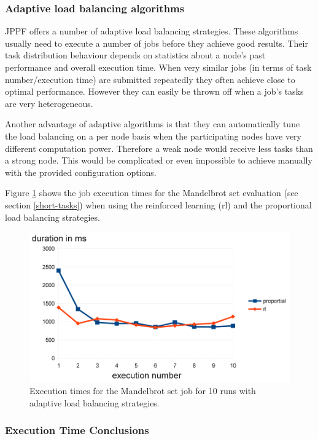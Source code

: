 \documentclass[english]{uzhpub}
\begin{document}
\subsubsection{Adaptive load balancing algorithms}

JPPF offers a number of adaptive load balancing strategies. These algorithms usually need to execute a number of jobs before they achieve good results. Their task distribution behaviour depends on statistics about a node's past performance and overall execution time. When very similar jobs (in terms of task number/execution time) are submitted repeatedly they often achieve close to optimal performance. However they can easily be thrown off when a job's tasks are very heterogeneous.

Another advantage of adaptive algorithms is that they can automatically tune the load balancing on a per node basis when the participating nodes have very different computation power. Therefore a weak node would receive less tasks than a strong node. This would be complicated or even impossible to achieve manually with the provided configuration options.

Figure \ref{fig:evaluation-learning} shows the job execution times for the Mandelbrot set evaluation (see section \ref{short-tasks}) when using the reinforced learning (rl) and the proportional load balancing strategies.

\begin{figure}[h]
\centering
\includegraphics[scale=0.7]{images/learning-duration.pdf}
\caption{Execution times for the Mandelbrot set job for 10 runs with adaptive load balancing strategies.}
\label{fig:evaluation-learning}
\end{figure}

\subsubsection{Execution Time Conclusions}
\end{document}
